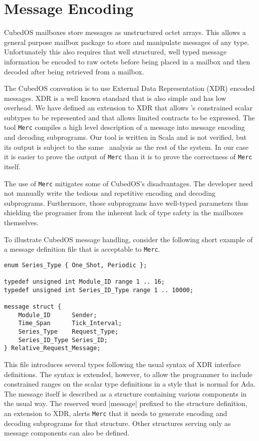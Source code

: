 
\section{Message Encoding}
\label{section-message-encoding}

CubedOS mailboxes store messages as unstructured octet arrays. This allows a general purpose
mailbox package to store and manipulate messages of any type. Unfortunately this also requires
that well structured, well typed message information be encoded to raw octets before being
placed in a mailbox and then decoded after being retrieved from a mailbox.

The CubedOS convention is to use External Data Representation (XDR) encoded messages. XDR is a
well known standard \cite{rfc-4506} that is also simple and has low overhead. We have defined an
extension to XDR that allows \SPARK's constrained scalar subtypes to be represented and that
allows limited contracts to be expressed. The tool \texttt{Merc} compiles a high level
description of a message into message encoding and decoding subprograms. Our tool is written in
Scala and is not verified, but its output is subject to the same \SPARK\ analysis as the rest of
the system. In our case it is easier to prove the output of \texttt{Merc} than it is to prove
the correctness of \texttt{Merc} itself.

The use of \texttt{Merc} mitigates some of CubedOS's disadvantages. The developer need not
manually write the tedious and repetitive encoding and decoding subprograms. Furthermore, those
subprograms have well-typed parameters thus shielding the programer from the inherent lack of
type safety in the mailboxes themselves.

To illustrate CubedOS message handling, consider the following short example of a message
definition file that is acceptable to \texttt{Merc}.

\begin{verbatim}
enum Series_Type { One_Shot, Periodic };

typedef unsigned int Module_ID range 1 .. 16;
typedef unsigned int Series_ID_Type range 1 .. 10000;

message struct {
    Module_ID      Sender;
    Time_Span      Tick_Interval;
    Series_Type    Request_Type;
    Series_ID_Type Series_ID;
} Relative_Request_Message;
\end{verbatim}

This file introduces several types following the usual syntax of XDR interface definitions. The
syntax is extended, however, to allow the programmer to include constrained ranges on the scalar
type definitions in a style that is normal for Ada. The message itself is described as a
structure containing various components in the usual way. The reserved word |message| prefixed
to the structure definition, an extension to XDR, alerts \texttt{Merc} that it needs to generate
encoding and decoding subprograms for that structure. Other structures serving only as message
components can also be defined.

